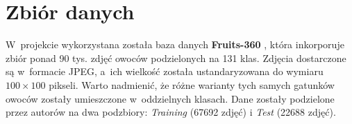 \section{Zbiór danych}

W~projekcie wykorzystana została baza danych \textbf{Fruits-360} \cite{fruits-360}, która inkorporuje zbiór ponad 90 tys. zdjęć owoców podzielonych na 131 klas. Zdjęcia dostarczone są w~formacie JPEG, a~ich wielkość została ustandaryzowana do wymiaru $100\times100$ pikseli. Warto nadmienić, że różne warianty tych samych gatunków owoców zostały umieszczone w~oddzielnych klasach. Dane zostały podzielone przez autorów na dwa podzbiory: \textit{Training} (67692 zdjęć) i \textit{Test} (22688 zdjęć).



